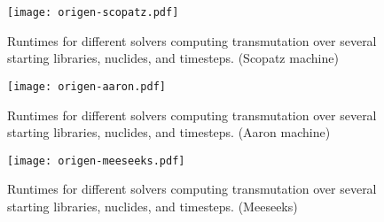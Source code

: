 
\begin{figure}[!ht]
\centering
\texttt{[image: origen-scopatz.pdf]}
\caption{Runtimes for different solvers computing transmutation over several starting libraries, nuclides, and timesteps.
(Scopatz machine)}
\label{fig:origen-scopatz}
\end{figure}

\begin{figure}[!ht]
\centering
\texttt{[image: origen-aaron.pdf]}
\caption{Runtimes for different solvers computing transmutation over several starting libraries, nuclides, and timesteps.
 (Aaron machine)}
\label{fig:origen-aaron}
\end{figure}

\begin{figure}[!ht]
\centering
\texttt{[image: origen-meeseeks.pdf]}
\caption{Runtimes for different solvers computing transmutation over several starting libraries, nuclides, and timesteps.
 (Meeseeks)}
\label{fig:origen-meeseeks}
\end{figure}
